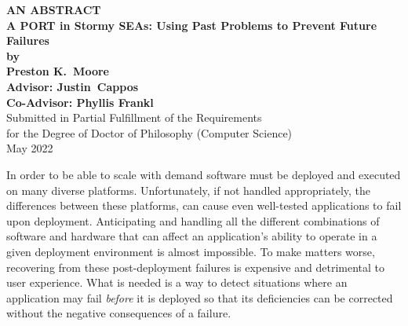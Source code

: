 \begin{center}

{\large\bf
   AN ABSTRACT\\[3ex]
   A PORT in Stormy SEAs: Using Past Problems to Prevent Future Failures\\[2ex]
   by\\[3ex]
   Preston K.\ Moore\\[3ex]
   Advisor: Justin\ Cappos\\[2ex]
   Co-Advisor: Phyllis Frankl
}\\[3ex]
Submitted in Partial Fulfillment of the Requirements\\[2ex]
for the Degree of Doctor of Philosophy (Computer Science)\\[3ex]
May 2022
\end{center}

\vspace*{2.5ex}


In order to be able to scale with demand software must be deployed and executed on
many diverse platforms.
Unfortunately, if not handled appropriately, 
the differences between these platforms,
can cause even well-tested applications to fail upon deployment.
Anticipating and handling all the different combinations of
software and hardware that can affect an application’s ability to operate
in a given deployment environment is almost impossible.
To make matters worse,
recovering from these post-deployment failures is expensive and
detrimental to user experience.
What is needed is a way to detect situations where an application may fail
\textit{before} it is deployed so that its deficiencies can be corrected without the negative consequences of a failure.

